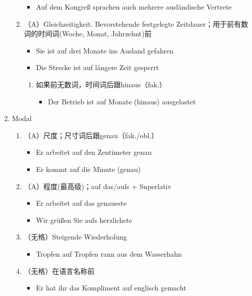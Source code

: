 \documentclass[UTF8]{report}
\begin{document}
\begin{enumerate}
\begin{enumerate}
\begin{itemize}
            \item Auf dem Kongreß sprachen auch mehrere ausländische Vertrete
        \end{itemize}
        \item （A）Gleichzeitigkeit. Bevorstehende festgelegte Zeitdauer；用于前有数词的时间词(Woche, Monat, Jahrzehnt)前
        \begin{itemize}
            \item Sie ist auf drei Monate ins Ausland gefahren
            \item Die Strecke ist auf längere Zeit gesperrt
        \end{itemize}
        \begin{enumerate}
            \item 如果前无数词，时间词后跟hinaus（fak.）
            \begin{itemize}
                \item Der Betrieb ist auf Monate (hinaus) ausgelastet
            \end{itemize}
        \end{enumerate}
    \end{enumerate}
    \item Modal
    \begin{enumerate}
        \item （A）尺度；尺寸词后跟genau（fak./obl.）
        \begin{itemize}
            \item Er arbeitet auf den Zentimeter genau
            \item Er kommt auf die Minute (genau)
        \end{itemize}
        \item （A）程度(最高级)；auf das/aufs + Superlativ
        \begin{itemize}
            \item Er arbeitet auf das genaueste
            \item Wir grüßen Sie aufs herzlichste
        \end{itemize}
        \item （无格）Steigende Wiederholung
        \begin{itemize}
            \item Tropfen auf Tropfen rann aus dem Wasserhahn
        \end{itemize}
        \item （无格）在语言名称前
        \begin{itemize}
            \item Er hat ihr das Kompliment auf englisch gemacht

\end{itemize}
\end{enumerate}
\end{enumerate}
\end{document}

